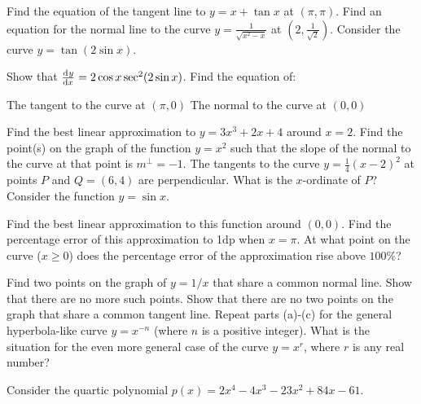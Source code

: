\begin{questions}
  \questioM Find the equation of the tangent line to $ y = x + \tan x $ at $ (\pi, \pi) $.
  \questioM Find an equation for the normal line to the curve $ y = \frac{1}{\sqrt{x^2 - x}} $ at $ (2, \frac{1}{\sqrt{2}}) $.
  \question Consider the curve $ y = \tan(2\sin x) $.
    \begin{parts}
      \parA Show that $ \od{y}{x} = 2\cos x \sec^2 (2 \sin x) $.
      \parM Find the equation of:
        \begin{subparts}
          \subpart The tangent to the curve at $ (\pi, 0) $
          \subpart The normal to the curve at $ (0, 0) $
        \end{subparts}
    \end{parts}
  \questioM Find the best linear approximation to $ y = 3x^3 + 2x + 4 $ around $ x = 2 $.
  \questioM Find the point(s) on the graph of the function $ y = x^2 $ such that the slope of the normal to the curve at that point is $ m^\perp = -1 $.
  \questioE The tangents to the curve $ y = \frac{1}{4}(x - 2)^2 $ at points $ P $ and $ Q = (6,4) $ are perpendicular. What is the $ x$-ordinate of $ P $?
  \question Consider the function $ y = \sin x $.
    \begin{parts}
      \parM Find the best linear approximation to this function around $ (0,0) $.
      \parM Find the percentage error of this approximation to 1dp when $ x = \pi $.
      \parE At what point on the curve ($ x \geq 0 $) does the percentage error of the approximation rise above $ 100\% $?
    \end{parts}
  \question
    \begin{parts}
      \parM Find two points on the graph of $ y = 1/x $ that share a common normal line.
      \parM Show that there are no more such points.
      \parM Show that there are no two points on the graph that share a common tangent line.
      \parE Repeat parts (a)-(c) for the general hyperbola-like curve $ y = x^{-n} $ (where $ n $ is a positive integer).
      \parS What is the situation for the even more general case of the curve $ y = x^r $, where $ r $ is any real number?
    \end{parts}
  \question Consider the quartic polynomial $ p(x) = 2x^4 -4x^3 - 23x^2 + 84x - 61 $.
    \begin{parts}

\end{parts}
\end{questions}
